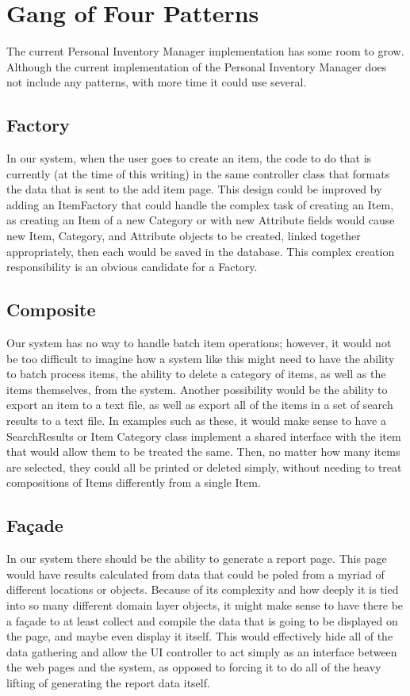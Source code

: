 \documentclass{article}
\begin{document}
\section{Gang of Four Patterns}
The current Personal Inventory Manager implementation has some room to grow. Although the current implementation of the Personal Inventory Manager does not include any patterns, with more time it could use several. \\
\subsection{Factory}
In our system, when the user goes to create an item, the code to do that is currently (at the time of this writing) in the same controller class that formats the data that is sent to the add item page. This design could be improved by adding an ItemFactory that could handle the complex task of creating an Item, as creating an Item of a new Category or with new Attribute fields would cause new Item, Category, and Attribute objects to be created, linked together appropriately, then each would be saved in the database. This complex creation responsibility is an obvious candidate for a Factory. \\
\subsection{Composite}
Our system has no way to handle batch item operations; however, it would not be too difficult to imagine how a system like this might need to have the ability to batch process items, the ability to delete a category of items, as well as the items themselves, from the system. Another possibility would be the ability to export an item to a text file, as well as export all of the items in a set of search results to a text file. In examples such as these, it would make sense to have a SearchResults or Item Category class implement a shared interface with the item that would allow them to be treated the same. Then, no matter how many items are selected, they could all be printed or deleted simply, without needing to treat compositions of Items differently from a single Item.\\
\subsection{Fa\c{c}ade}
In our system there should be the ability to generate a report page. This page would have results calculated from data that could be poled from a myriad of different locations or objects. Because of its complexity and how deeply it is tied into so many different domain layer objects, it might make sense to have there be a façade to at least collect and compile the data that is going to be displayed on the page, and maybe even display it itself. This would effectively hide all of the data gathering and allow the UI controller to act simply as an interface between the web pages and the system, as opposed to forcing it to do all of the heavy lifting of generating the report data itself. \\
\end{document}

